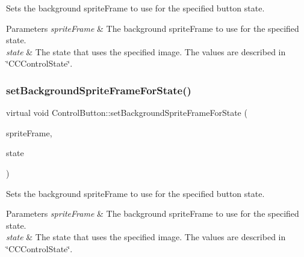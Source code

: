 Sets the background sprite\+Frame to use for the specified button state.


\begin{DoxyParams}{Parameters}
{\em sprite\+Frame} & The background sprite\+Frame to use for the specified state. \\
\hline
{\em state} & The state that uses the specified image. The values are described in \char`\"{}\+C\+C\+Control\+State\char`\"{}. \\
\hline
\end{DoxyParams}
\mbox{\label{classControlButton_a0464d66cede6268181dd95c7c6a10c0f}} 
\subsubsection{\texorpdfstring{set\+Background\+Sprite\+Frame\+For\+State()}{setBackgroundSpriteFrameForState()}\hspace{0.1cm}{\footnotesize\ttfamily [2/2]}}
{\footnotesize\ttfamily virtual void Control\+Button\+::set\+Background\+Sprite\+Frame\+For\+State (\begin{DoxyParamCaption}\item[{\hyperlink{classSpriteFrame}{Sprite\+Frame} $\ast$}]{sprite\+Frame,  }\item[{\hyperlink{classControl_a89e9598cd785841ac91cff3c4798c469}{State}}]{state }\end{DoxyParamCaption})\hspace{0.3cm}{\ttfamily [virtual]}}

Sets the background sprite\+Frame to use for the specified button state.


\begin{DoxyParams}{Parameters}
{\em sprite\+Frame} & The background sprite\+Frame to use for the specified state. \\
\hline
{\em state} & The state that uses the specified image. The values are described in \char`\"{}\+C\+C\+Control\+State\char`\"{}. \\
\hline
\end{DoxyParams}
\mbox{\label{classControlButton_a7a6e29777bb4a89dab5ac436d92287ac}} 
